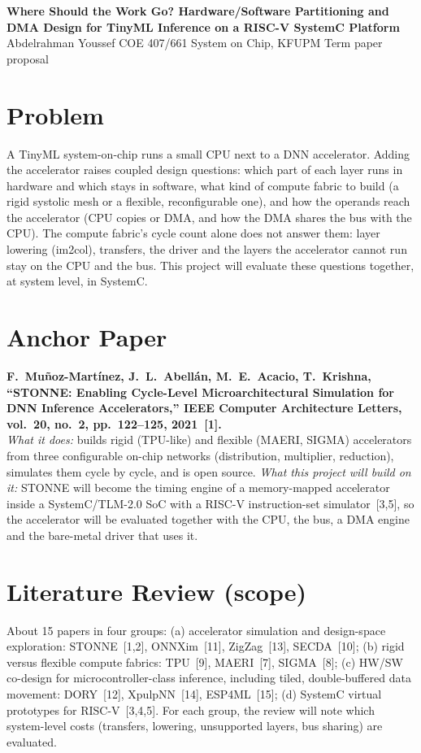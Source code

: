 \documentclass[10pt,a4paper]{article}
\begin{document}
\begin{center}
{\large\bfseries Where Should the Work Go? Hardware/Software Partitioning and DMA Design for TinyML Inference on a RISC-V SystemC Platform}\\[3pt]
{\small\color{gray!70!black} Abdelrahman Youssef \textperiodcentered{} COE 407/661 System on Chip, KFUPM \textperiodcentered{} Term paper proposal}
\end{center}
\vspace{-1ex}
\fontsize{9.6}{11.5}\selectfont

\section{Problem}
A TinyML system-on-chip runs a small CPU next to a DNN accelerator. Adding the accelerator raises coupled design questions: which part of each layer runs in hardware and which stays in software, what kind of compute fabric to build (a rigid systolic mesh or a flexible, reconfigurable one), and how the operands reach the accelerator (CPU copies or DMA, and how the DMA shares the bus with the CPU). The compute fabric's cycle count alone does not answer them: layer lowering (im2col), transfers, the driver and the layers the accelerator cannot run stay on the CPU and the bus. This project will evaluate these questions together, at system level, in SystemC.

\section{Anchor Paper}
\textbf{F.~Mu\~noz-Mart\'inez, J.~L.~Abell\'an, M.~E.~Acacio, T.~Krishna, ``STONNE: Enabling Cycle-Level Microarchitectural Simulation for DNN Inference Accelerators,'' IEEE Computer Architecture Letters, vol.~20, no.~2, pp.~122--125, 2021~[1].}\\
\emph{What it does:} builds rigid (TPU-like) and flexible (MAERI, SIGMA) accelerators from three configurable on-chip networks (distribution, multiplier, reduction), simulates them cycle by cycle, and is open source. \emph{What this project will build on it:} STONNE will become the timing engine of a memory-mapped accelerator inside a SystemC/TLM-2.0 SoC with a RISC-V instruction-set simulator~[3,5], so the accelerator will be evaluated together with the CPU, the bus, a DMA engine and the bare-metal driver that uses it.

\section{Literature Review (scope)}
About 15 papers in four groups: (a) accelerator simulation and design-space exploration: STONNE~[1,2], ONNXim~[11], ZigZag~[13], SECDA~[10]; (b) rigid versus flexible compute fabrics: TPU~[9], MAERI~[7], SIGMA~[8]; (c) HW/SW co-design for microcontroller-class inference, including tiled, double-buffered data movement: DORY~[12], XpulpNN~[14], ESP4ML~[15]; (d) SystemC virtual prototypes for RISC-V~[3,4,5]. For each group, the review will note which system-level costs (transfers, lowering, unsupported layers, bus sharing) are evaluated.
\end{document}
